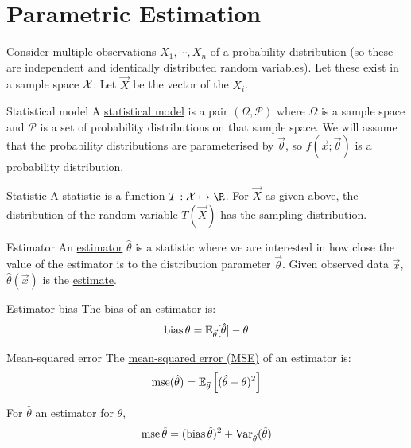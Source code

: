 \documentclass[../Main.tex]{subfiles}
\begin{document}
\section{Parametric Estimation}
Consider multiple observations $X_1, \cdots, X_n$ of a probability distribution (so these are independent and identically distributed random variables). Let these exist in a sample space $\mathcal{X}$. Let $\vec{X}$ be the vector of the $X_i$.
\begin{definition}{Statistical model}
    A \underline{statistical model} is a pair $(\Omega, \mathcal{P})$ where $\Omega$ is a sample space and $\mathcal{P}$ is a set of probability distributions on that sample space. We will assume that the probability distributions are parameterised by $\vec{\theta}$, so $f(\vec{x};\vec{\theta})$ is a probability distribution.
\end{definition}
\begin{definition}{Statistic}
    A \underline{statistic} is a function $T : \samplespace \mapsto \R$. For $\vec{X}$ as given above, the distribution of the random variable $T(\vec{X})$ has the \underline{sampling distribution}.
\end{definition}
\begin{definition}{Estimator}
    An \underline{estimator} $\hat{\theta}$ is a statistic where we are interested in how close the value of the estimator is to the distribution parameter $\vec{\theta}$. Given observed data $\vec{x}$, $\hat{\theta}(\vec{x})$ is the \underline{estimate}.
\end{definition}
\begin{definition}{Estimator bias}
    The \underline{bias} of an estimator is:
    \begin{equation*}
        \operatorname{bias}{\theta} = \mathbb{E}_{\vec{\theta}}[\hat{\theta}] - \theta
    \end{equation*}
\end{definition}
\begin{definition}{Mean-squared error}
    The \underline{mean-squared error (MSE)} of an estimator is:
    \begin{equation*}
        \operatorname{mse}(\hat{\theta}) = \mathbb{E}_{\vec{\theta}}\left[(\hat{\theta} - \theta)^2\right]
    \end{equation*}
\end{definition}
\begin{proposition}
    For $\hat{\theta}$ an estimator for $\theta$,
    \begin{equation*}
        \operatorname{mse}{\hat{\theta}} = (\operatorname{bias}{\hat{\theta}})^2 + \operatorname{Var}_{\vec{\theta}}(\hat{\theta})
    \end{equation*}
    \label{propBiasVarDecompose}
\end{proposition}
\end{document}
